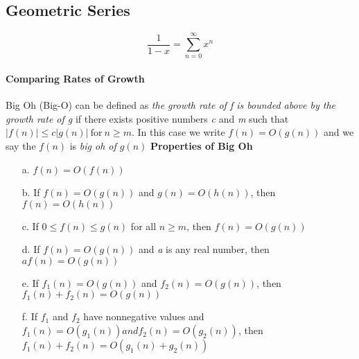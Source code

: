 \documentclass[10pt,twocolumn]{article}
\begin{document}
	\subsection*{Geometric Series}
		\[\frac{1}{1-x}=\sum_{n=0}^\infty x^n\]
	
        \paragraph*{Comparing Rates of Growth}
        Big Oh (Big-O) can be defined as \textit{the growth rate of f is
          bounded above by the growth rate of g} if there exists positive
        numbers \textit{c} and \textit{m} such that $|f(n)| \leq
        c|g(n)| \: \textrm{for}\: n\geq m$. In this case we write $f(n)
        = O(g(n))$ and we say the $f(n)$ is \textit{big oh of $g(n)$}
        \textbf{Properties of Big Oh}
       \begin{itemize}
        \item[a.] $f(n)=O(f(n))$
        \item[b.] If $f(n)=O(g(n))$ and $ g(n)=O(h(n))$, then $f(n)=O(h(n))$
        \item[c.] If $0\leq f(n) \leq g(n)$ for all $n \geq m$, then $f(n)=O(g(n))$
        \item[d.] If $f(n)=O(g(n))$ and \textit{a} is any real number, then $af(n)=O(g(n))$
        \item[e.] If $f_1(n)=O(g(n))$ and $f_2(n)=O(g(n))$, then $f_1(n) + f_2(n) = O(g(n))$
        \item[f.] If $f_1$ and $f_2$ have nonnegative values and
          $f_1(n) = O(g_1(n)) and f_2(n) = O(g_2(n))$, then $f_1(n) +
          f_2(n) = O(g_1(n) + g_2(n))$
	\end{itemize}
\end{document}
